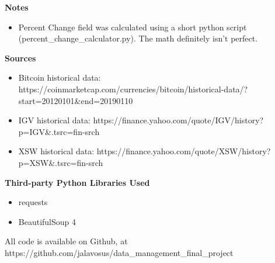 \documentclass[12pt]{article}
\begin{document}
\begin{flushleft}

\begin{large}
\textbf{Notes}
\end{large}

\begin{itemize}
\item Percent Change field was calculated using a short python script (percent\_change\_calculator.py). The math definitely isn't perfect.
\end{itemize}

\begin{large}
\textbf{Sources}
\end{large}

\begin{itemize}
\item Bitcoin historical data: https://coinmarketcap.com/currencies/bitcoin/historical-data/?start=20120101\&end=20190110
\item IGV historical data: https://finance.yahoo.com/quote/IGV/history?p=IGV\&.tsrc=fin-srch
\item XSW historical data: https://finance.yahoo.com/quote/XSW/history?p=XSW\&.tsrc=fin-srch
\end{itemize}

\pagebreak
\begin{large}
\textbf{Third-party Python Libraries Used}
\end{large}
 
\begin{itemize}
\item requests
\item BeautifulSoup 4
\end{itemize}


All code is available on Github, at https://github.com/jalavosus/data\_management\_final\_project

\end{flushleft}
\end{document}
